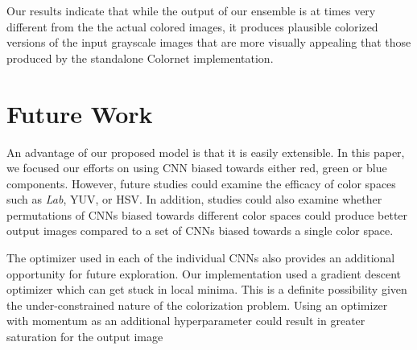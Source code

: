 \documentclass[10pt,twocolumn,letterpaper]{article}
\begin{document}
Our results indicate that while the output of our ensemble is at times very different from the the actual colored images, it produces  plausible colorized versions of the input grayscale images that are more visually appealing that those produced by the standalone Colornet implementation.

\section{Future Work}
An advantage of our proposed model is that it is easily extensible. In this paper, we focused our efforts on using CNN biased towards either red, green or blue components. However, future studies could examine the efficacy of color spaces such as \textit{Lab}, YUV, or HSV. In addition, studies could also examine whether permutations of CNNs biased towards different color spaces could produce better output images compared to a set of CNNs biased towards a single color space.

The optimizer used in each of the individual CNNs also provides an additional opportunity for future exploration. Our implementation used a gradient descent optimizer which can get stuck in local minima. This is a definite possibility given the under-constrained nature of the colorization problem. Using an optimizer with momentum as an additional hyperparameter could result in greater saturation for the output image

{\small
    
    
}
\end{document}
